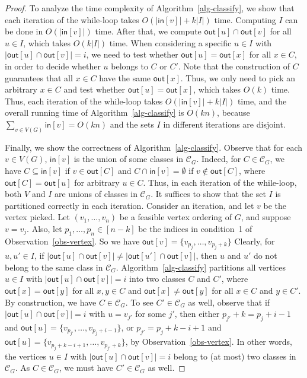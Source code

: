 \documentclass[11pt]{article}
\begin{document}
\begin{proof}
To analyze the time complexity of Algorithm~\ref{alg-classify}, we show that each iteration of the while-loop takes $O(|\mathsf{in}[v]|+k|I|)$ time.
Computing $I$ can be done in $O(|\mathsf{in}[v]|)$ time.
After that, we compute $\mathsf{out}[u] \cap \mathsf{out}[v]$ for all $u \in I$, which takes $O(k|I|)$ time.
When considering a specific $u \in I$ with $|\mathsf{out}[u] \cap \mathsf{out}[v]| = i$, we need to test whether $\mathsf{out}[u] = \mathsf{out}[x]$ for all $x \in C$, in order to decide whether $u$ belongs to $C$ or $C'$.
Note that the construction of $C$ guarantees that all $x \in C$ have the same $\mathsf{out}[x]$.
Thus, we only need to pick an arbitrary $x \in C$ and test whether $\mathsf{out}[u] = \mathsf{out}[x]$, which takes $O(k)$ time.
Thus, each iteration of the while-loop takes $O(|\mathsf{in}[v]|+k|I|)$ time, and the overall running time of Algorithm~\ref{alg-classify} is $O(kn)$, because $\sum_{v \in V(G)} \mathsf{in}[v] = O(kn)$ and the sets $I$ in different iterations are disjoint.

Finally, we show the correctness of Algorithm~\ref{alg-classify}.
Observe that for each $v \in V(G)$, $\mathsf{in}[v]$ is the union of some classes in $\mathcal{C}_G$.
Indeed, for $C \in \mathcal{C}_G$, we have $C \subseteq \mathsf{in}[v]$ if $v \in \mathsf{out}[C]$ and $C \cap \mathsf{in}[v] = \emptyset$ if $v \not\in \mathsf{out}[C]$, where $\mathsf{out}[C] = \mathsf{out}[u]$ for arbitrary $u \in C$.
Thus, in each iteration of the while-loop, both $V$ and $I$ are unions of classes in $\mathcal{C}_G$.
It suffices to show that the set $I$ is partitioned correctly in each iteration.
Consider an iteration, and let $v$ be the vertex picked.
Let $(v_1,\dots,v_n)$ be a feasible vertex ordering of $G$, and suppose $v = v_j$.
Also, let $p_1,\dots,p_n \in [n-k]$ be the indices in condition~1 of Observation~\ref{obs-vertex}.
So we have $\mathsf{out}[v] = \{v_{p_j},\dots,v_{p_j+k}\}$
Clearly, for $u,u' \in I$, if $|\mathsf{out}[u] \cap \mathsf{out}[v]| \neq |\mathsf{out}[u'] \cap \mathsf{out}[v]|$, then $u$ and $u'$ do not belong to the same class in $\mathcal{C}_G$.
Algorithm~\ref{alg-classify} partitions all vertices $u \in I$ with $|\mathsf{out}[u] \cap \mathsf{out}[v]| = i$ into two classes $C$ and $C'$, where $\mathsf{out}[x] = \mathsf{out}[y]$ for all $x,y \in C$ and $\mathsf{out}[x] \neq \mathsf{out}[y]$ for all $x \in C$ and $y \in C'$.
By construction, we have $C \in \mathcal{C}_G$.
To see $C' \in \mathcal{C}_G$ as well, observe that if $|\mathsf{out}[u] \cap \mathsf{out}[v]| = i$ with $u = v_{j'}$ for some $j'$, then either $p_{j'} + k = p_j + i - 1$ and $\mathsf{out}[u] = \{v_{p_{j'}},\dots,v_{p_j+i-1}\}$, or $p_{j'} = p_j + k - i + 1$ and $\mathsf{out}[u] = \{v_{p_j+k-i+1},\dots,v_{p_{j'}+k}\}$, by Observation~\ref{obs-vertex}.
In other words, the vertices $u \in I$ with $|\mathsf{out}[u] \cap \mathsf{out}[v]| = i$ belong to (at most) two classes in $\mathcal{C}_G$.
As $C \in \mathcal{C}_G$, we must have $C' \in \mathcal{C}_G$ as well.
\end{proof}
\end{document}
